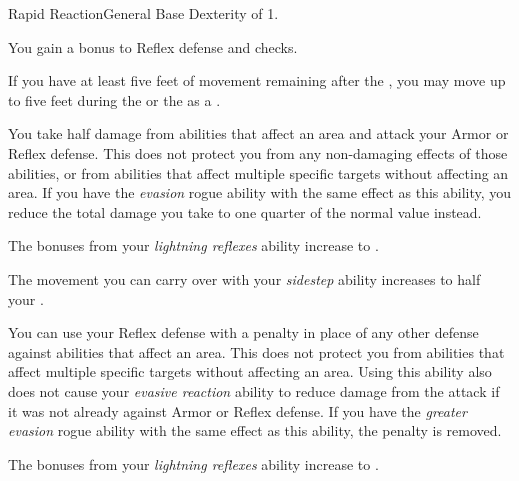     \begin{feat}{Rapid Reaction}{General}
        \featpre Base Dexterity of 1.

         You gain a  bonus to Reflex defense and  checks.

         If you have at least five feet of movement remaining after the , you may move up to five feet during the  or the  as a .

         You take half damage from abilities that affect an area and attack your Armor or Reflex defense.
        This does not protect you from any non-damaging effects of those abilities, or from abilities that affect multiple specific targets without affecting an area.
        If you have the \textit{evasion} rogue ability with the same effect as this ability, you reduce the total damage you take to one quarter of the normal value instead.

         The bonuses from your \textit{lightning reflexes} ability increase to .

         The movement you can carry over with your \textit{sidestep} ability increases to half your .

         You can use your Reflex defense with a  penalty in place of any other defense against abilities that affect an area.
        This does not protect you from abilities that affect multiple specific targets without affecting an area.
        Using this ability also does not cause your \textit{evasive reaction} ability to reduce damage from the attack if it was not already against Armor or Reflex defense.
        If you have the \textit{greater evasion} rogue ability with the same effect as this ability, the penalty is removed.

         The bonuses from your \textit{lightning reflexes} ability increase to .
    \end{feat}

